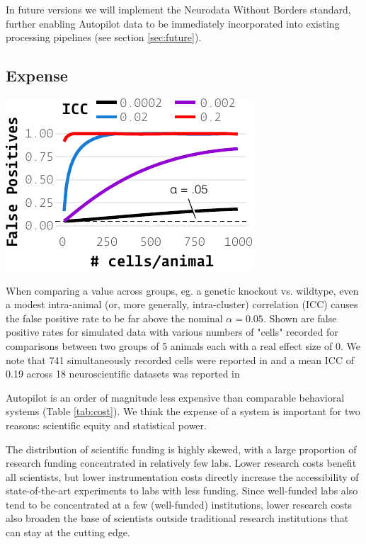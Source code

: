 In future versions we will implement the Neurodata Without Borders standard\citep{rubelNWBAccessibleData2019}, further enabling Autopilot data to be immediately incorporated into existing processing pipelines (see section \ref{sec:future}).

\subsection{Expense}
\label{sec:expense}

\begin{marginfigure}[2.6cm]
\includegraphics[]{figures/fpr.pdf}
\caption{When comparing a value across groups, eg. a genetic knockout vs. wildtype, even a modest intra-animal (or, more generally, intra-cluster) correlation (ICC) causes the false positive rate to be far above the nominal $\alpha = 0.05$. Shown are false positive rates for simulated data with various numbers of "cells" recorded for comparisons between two groups of 5 animals each with a real effect size of 0. We note that 741 simultaneously recorded cells were reported in \citep{junFullyIntegratedSilicon2017} and a mean ICC of 0.19 across 18 neuroscientific datasets was reported in \citep{aartsSolutionDependencyUsing2014}}
\label{fig:icc}
\end{marginfigure}

Autopilot is an order of magnitude less expensive than comparable behavioral systems (Table \ref{tab:cost}). We think the expense of a system is important for two reasons: scientific equity and statistical power. 

The distribution of scientific funding is highly skewed, with a large proportion of research funding concentrated in relatively few labs\citep{katzBiomedicalEliteInequality2017}. Lower research costs benefit all scientists, but lower instrumentation costs directly increase the accessibility of state-of-the-art experiments to labs with less funding. Since well-funded labs also tend to be concentrated at a few (well-funded) institutions, lower research costs also broaden the base of scientists outside traditional research institutions that can stay at the cutting edge\citep{ashkenasEvenAffirmativeAction2017,clausetSystematicInequalityHierarchy2015,pearceExpandingEquitableAccess2019}.



